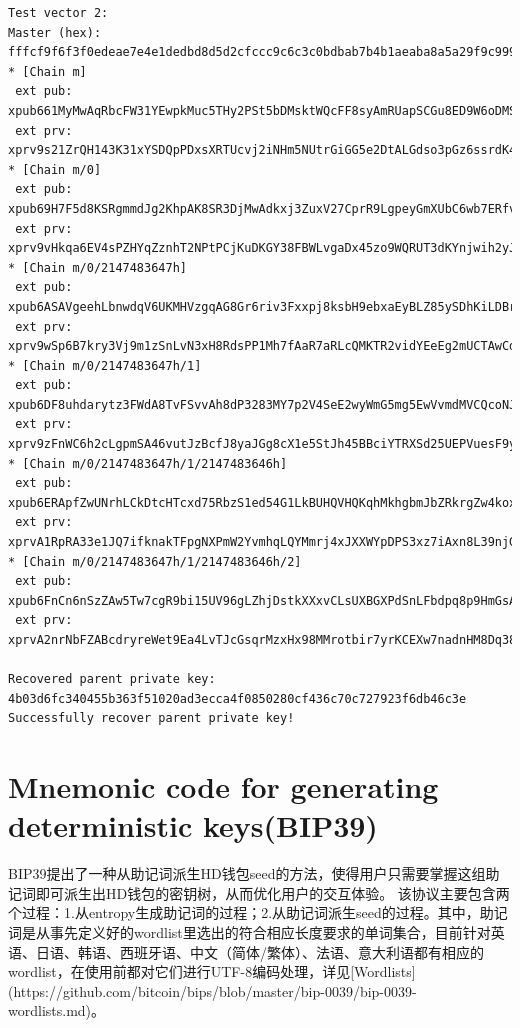 \documentclass{article}
\begin{document}
\begin{lstlisting}
Test vector 2:
Master (hex): fffcf9f6f3f0edeae7e4e1dedbd8d5d2cfccc9c6c3c0bdbab7b4b1aeaba8a5a29f9c999693908d8a8784817e7b7875726f6c696663605d5a5754514e4b484542
* [Chain m]
 ext pub: xpub661MyMwAqRbcFW31YEwpkMuc5THy2PSt5bDMsktWQcFF8syAmRUapSCGu8ED9W6oDMSgv6Zz8idoc4a6mr8BDzTJY47LJhkJ8UB7WEGuduB
 ext prv: xprv9s21ZrQH143K31xYSDQpPDxsXRTUcvj2iNHm5NUtrGiGG5e2DtALGdso3pGz6ssrdK4PFmM8NSpSBHNqPqm55Qn3LqFtT2emdEXVYsCzC2U
* [Chain m/0]
 ext pub: xpub69H7F5d8KSRgmmdJg2KhpAK8SR3DjMwAdkxj3ZuxV27CprR9LgpeyGmXUbC6wb7ERfvrnKZjXoUmmDznezpbZb7ap6r1D3tgFxHmwMkQTPH
 ext prv: xprv9vHkqa6EV4sPZHYqZznhT2NPtPCjKuDKGY38FBWLvgaDx45zo9WQRUT3dKYnjwih2yJD9mkrocEZXo1ex8G81dwSM1fwqWpWkeS3v86pgKt
* [Chain m/0/2147483647h]
 ext pub: xpub6ASAVgeehLbnwdqV6UKMHVzgqAG8Gr6riv3Fxxpj8ksbH9ebxaEyBLZ85ySDhKiLDBrQSARLq1uNRts8RuJiHjaDMBU4Zn9h8LZNnBC5y4a
 ext prv: xprv9wSp6B7kry3Vj9m1zSnLvN3xH8RdsPP1Mh7fAaR7aRLcQMKTR2vidYEeEg2mUCTAwCd6vnxVrcjfy2kRgVsFawNzmjuHc2YmYRmagcEPdU9
* [Chain m/0/2147483647h/1]
 ext pub: xpub6DF8uhdarytz3FWdA8TvFSvvAh8dP3283MY7p2V4SeE2wyWmG5mg5EwVvmdMVCQcoNJxGoWaU9DCWh89LojfZ537wTfunKau47EL2dhHKon
 ext prv: xprv9zFnWC6h2cLgpmSA46vutJzBcfJ8yaJGg8cX1e5StJh45BBciYTRXSd25UEPVuesF9yog62tGAQtHjXajPPdbRCHuWS6T8XA2ECKADdw4Ef
* [Chain m/0/2147483647h/1/2147483646h]
 ext pub: xpub6ERApfZwUNrhLCkDtcHTcxd75RbzS1ed54G1LkBUHQVHQKqhMkhgbmJbZRkrgZw4koxb5JaHWkY4ALHY2grBGRjaDMzQLcgJvLJuZZvRcEL
 ext prv: xprvA1RpRA33e1JQ7ifknakTFpgNXPmW2YvmhqLQYMmrj4xJXXWYpDPS3xz7iAxn8L39njGVyuoseXzU6rcxFLJ8HFsTjSyQbLYnMpCqE2VbFWc
* [Chain m/0/2147483647h/1/2147483646h/2]
 ext pub: xpub6FnCn6nSzZAw5Tw7cgR9bi15UV96gLZhjDstkXXxvCLsUXBGXPdSnLFbdpq8p9HmGsApME5hQTZ3emM2rnY5agb9rXpVGyy3bdW6EEgAtqt
 ext prv: xprvA2nrNbFZABcdryreWet9Ea4LvTJcGsqrMzxHx98MMrotbir7yrKCEXw7nadnHM8Dq38EGfSh6dqA9QWTyefMLEcBYJUuekgW4BYPJcr9E7j

Recovered parent private key: 4b03d6fc340455b363f51020ad3ecca4f0850280cf436c70c727923f6db46c3e
Successfully recover parent private key!
\end{lstlisting}

\section{Mnemonic code for generating deterministic keys(BIP39)}
BIP39提出了一种从助记词派生HD钱包seed的方法，使得用户只需要掌握这组助记词即可派生出HD钱包的密钥树，从而优化用户的交互体验。  
该协议主要包含两个过程：1.从entropy生成助记词的过程；2.从助记词派生seed的过程。其中，助记词是从事先定义好的wordlist里选出的符合相应长度要求的单词集合，目前针对英语、日语、韩语、西班牙语、中文（简体/繁体）、法语、意大利语都有相应的wordlist，在使用前都对它们进行UTF-8编码处理，详见[Wordlists](https://github.com/bitcoin/bips/blob/master/bip-0039/bip-0039-wordlists.md)。
\end{document}
